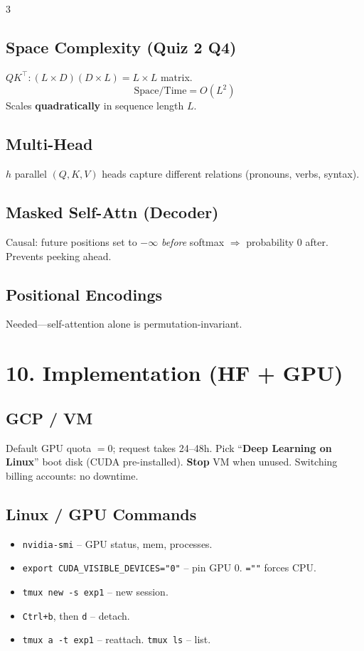 \documentclass[8pt,a4paper,landscape]{extarticle}
\begin{document}
\begin{multicols*}{3}
    \subsection*{Space Complexity (Quiz 2 Q4)}
    $QK^\top:(L{\times}D)(D{\times}L)=L{\times}L$ matrix.
    \[\boxed{\text{Space/Time}=O(L^2)}\]
    Scales \textbf{quadratically} in sequence length $L$.

    \subsection*{Multi-Head}
    $h$ parallel $(Q,K,V)$ heads capture different relations (pronouns, verbs, syntax).

    \subsection*{Masked Self-Attn (Decoder)}
    Causal: future positions set to $-\infty$ \emph{before} softmax $\Rightarrow$ probability 0 after. Prevents peeking ahead.

    \subsection*{Positional Encodings}
    Needed---self-attention alone is permutation-invariant.

    \section*{10. Implementation (HF + GPU)}

    \subsection*{GCP / VM}
    Default GPU quota $=0$; request takes 24--48h. Pick ``\textbf{Deep Learning on Linux}'' boot disk (CUDA pre-installed). \textbf{Stop} VM when unused. Switching billing accounts: no downtime.

    \subsection*{Linux / GPU Commands}
    \begin{itemize}
        \item \texttt{nvidia-smi} -- GPU status, mem, processes.
        \item \texttt{export CUDA\_VISIBLE\_DEVICES="0"} -- pin GPU 0. \texttt{=""} forces CPU.
        \item \texttt{tmux new -s exp1} -- new session.
        \item \texttt{Ctrl+b}, then \texttt{d} -- detach.
        \item \texttt{tmux a -t exp1} -- reattach. \texttt{tmux ls} -- list.
    \end{itemize}


\end{multicols*}
\end{document}
